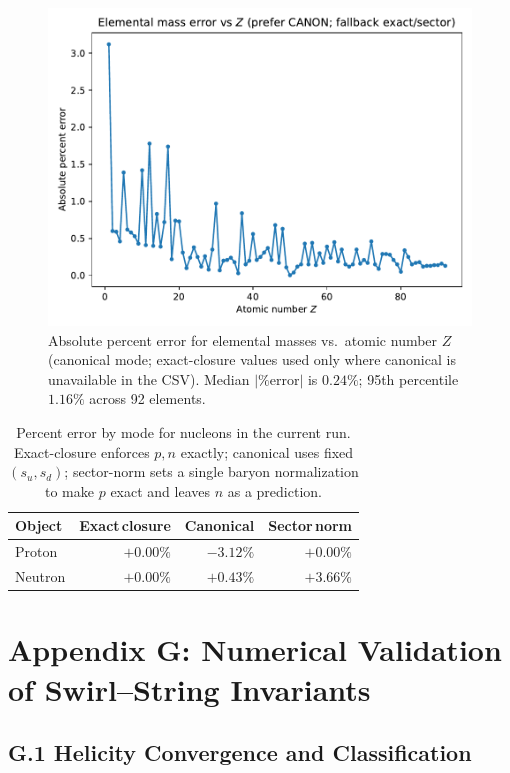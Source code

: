 \documentclass[11pt, preprint,titlepage]{revtex4-2}
\begin{document}
		\begin{figure}[t]
		\centering
		\includegraphics[width=0.75\linewidth]{images/elements_error_by_Z_canonical}
		\caption{Absolute percent error for elemental masses vs.\ atomic number \(Z\) (canonical mode; exact-closure values used only where canonical is unavailable in the CSV). Median \(|\%\text{error}|\) is \(0.24\%\); 95th percentile \(1.16\%\) across 92 elements.}
		\label{fig:elements_error_by_Z}
		\end{figure}

		\begin{table}[t]
		\centering
		\begin{tabular}{lrrr}
		\toprule
		\textbf{Object} & \textbf{Exact\,closure} & \textbf{Canonical} & \textbf{Sector\,norm} \\
		\midrule
		Proton  & \(+0.00\%\) & \(-3.12\%\) & \(+0.00\%\) \\
		Neutron & \(+0.00\%\) & \(+0.43\%\) & \(+3.66\%\) \\
		\bottomrule
		\end{tabular}
		\caption{Percent error by mode for nucleons in the current run. Exact-closure enforces \(p,n\) exactly; canonical uses fixed \((s_u,s_d)\); sector-norm sets a single baryon normalization to make \(p\) exact and leaves \(n\) as a prediction.}
		\label{tab:pn_modes}
		\end{table}


\appendix
\section*{Appendix G: Numerical Validation of Swirl–String Invariants}

\subsection*{G.1 Helicity Convergence and Classification}
\end{document}
